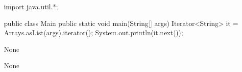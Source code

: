 \begin{code}
import java.util.*;

public class Main {
	public static void main(String[] args) {
    Iterator<String> it = Arrays.asList(args).iterator();
    System.out.println(it.next());
	}
}\end{code}

\lstset{language=,caption=Original Mungo output}
\begin{code}
None
\end{code}

\lstset{language=,caption=New Mungo output}
\begin{code}
None
\end{code}

